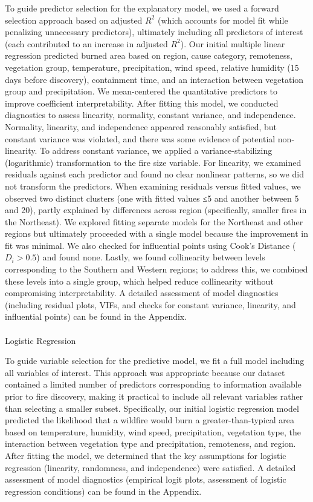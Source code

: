 \documentclass[
  letterpaper,
  DIV=11,
  numbers=noendperiod]{scrartcl}
\makeatletter
\let\oldparagraph\paragraph
\renewcommand{\paragraph}{
    \@ifstar
      \xxxParagraphStar
      \xxxParagraphNoStar
  }
\newcommand{\xxxParagraphStar}[1]{\oldparagraph*{#1}\mbox{}}
\newcommand{\xxxParagraphNoStar}[1]{\oldparagraph{#1}\mbox{}}
\makeatother
\begin{document}
To guide predictor selection for the explanatory model, we used a
forward selection approach based on adjusted \(R^2\) (which accounts for
model fit while penalizing unnecessary predictors), ultimately including
all predictors of interest (each contributed to an increase in adjusted
\(R^2\)). Our initial multiple linear regression predicted burned area
based on region, cause category, remoteness, vegetation group,
temperature, precipitation, wind speed, relative humidity (15 days
before discovery), containment time, and an interaction between
vegetation group and precipitation. We mean-centered the quantitative
predictors to improve coefficient interpretability. After fitting this
model, we conducted diagnostics to assess linearity, normality, constant
variance, and independence. Normality, linearity, and independence
appeared reasonably satisfied, but constant variance was violated, and
there was some evidence of potential non-linearity. To address constant
variance, we applied a variance-stabilizing (logarithmic) transformation
to the fire size variable. For linearity, we examined residuals against
each predictor and found no clear nonlinear patterns, so we did not
transform the predictors. When examining residuals versus fitted values,
we observed two distinct clusters (one with fitted values ≤5 and another
between 5 and 20), partly explained by differences across region
(specifically, smaller fires in the Northeast). We explored fitting
separate models for the Northeast and other regions but ultimately
proceeded with a single model because the improvement in fit was
minimal. We also checked for influential points using Cook's Distance
(\(D_i > 0.5\)) and found none. Lastly, we found collinearity between
levels corresponding to the Southern and Western regions; to address
this, we combined these levels into a single group, which helped reduce
collinearity without compromising interpretability. A detailed
assessment of model diagnostics (including residual plots, VIFs, and
checks for constant variance, linearity, and influential points) can be
found in the Appendix.

\paragraph{Logistic Regression}\label{logistic-regression}

To guide variable selection for the predictive model, we fit a full
model including all variables of interest. This approach was appropriate
because our dataset contained a limited number of predictors
corresponding to information available prior to fire discovery, making
it practical to include all relevant variables rather than selecting a
smaller subset. Specifically, our initial logistic regression model
predicted the likelihood that a wildfire would burn a
greater-than-typical area based on temperature, humidity, wind speed,
precipitation, vegetation type, the interaction between vegetation type
and precipitation, remoteness, and region. After fitting the model, we
determined that the key assumptions for logistic regression (linearity,
randomness, and independence) were satisfied. A detailed assessment of
model diagnostics (empirical logit plots, assessment of logistic
regression conditions) can be found in the Appendix.
\end{document}
